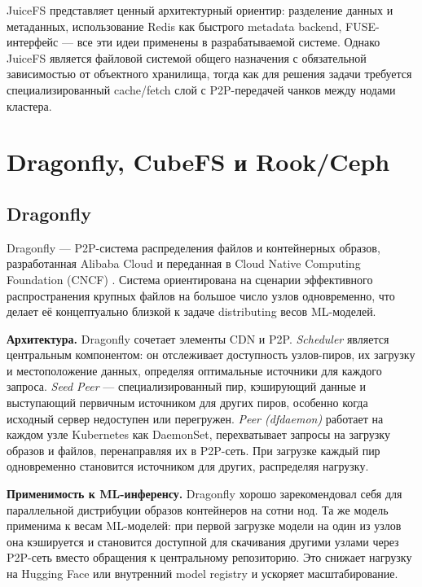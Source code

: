 JuiceFS представляет ценный архитектурный ориентир: разделение данных и метаданных, использование Redis как быстрого metadata backend, FUSE-интерфейс --- все эти идеи применены в разрабатываемой системе. Однако JuiceFS является файловой системой общего назначения с обязательной зависимостью от объектного хранилища, тогда как для решения задачи требуется специализированный cache/fetch слой с P2P-передачей чанков между нодами кластера.

\section{Dragonfly, CubeFS и Rook/Ceph}
\label{sec:alternatives}

\subsection*{Dragonfly}

Dragonfly --- P2P-система распределения файлов и контейнерных образов, разработанная Alibaba Cloud и переданная в Cloud Native Computing Foundation (CNCF) \cite{dragonfly_blog}. Система ориентирована на сценарии эффективного распространения крупных файлов на большое число узлов одновременно, что делает её концептуально близкой к задаче distributing весов ML-моделей.

\textbf{Архитектура.} Dragonfly сочетает элементы CDN и P2P. \textit{Scheduler} является центральным компонентом: он отслеживает доступность узлов-пиров, их загрузку и местоположение данных, определяя оптимальные источники для каждого запроса. \textit{Seed Peer} --- специализированный пир, кэширующий данные и выступающий первичным источником для других пиров, особенно когда исходный сервер недоступен или перегружен. \textit{Peer (dfdaemon)} работает на каждом узле Kubernetes как DaemonSet, перехватывает запросы на загрузку образов и файлов, перенаправляя их в P2P-сеть. При загрузке каждый пир одновременно становится источником для других, распределяя нагрузку.

\textbf{Применимость к ML-инференсу.} Dragonfly хорошо зарекомендовал себя для параллельной дистрибуции образов контейнеров на сотни нод. Та же модель применима к весам ML-моделей: при первой загрузке модели на один из узлов она кэшируется и становится доступной для скачивания другими узлами через P2P-сеть вместо обращения к центральному репозиторию. Это снижает нагрузку на Hugging Face или внутренний model registry и ускоряет масштабирование.

